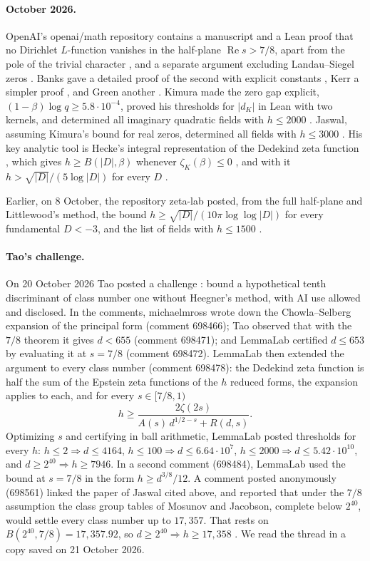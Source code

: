 \documentclass[11pt]{article}
\theoremstyle{definition}
\newcommand{\re}{\operatorname{Re}}
\begin{document}
\paragraph{October 2026.} OpenAI's openai/math repository \cite{OAImath} contains a manuscript and a Lean proof that no Dirichlet $L$-function vanishes in the half-plane $\re s > 7/8$, apart from the pole of the trivial character \cite{OAIqrh}, and a separate argument excluding Landau--Siegel zeros \cite{OAIsiegel}. Banks gave a detailed proof of the second with explicit constants \cite{Banks2026}, Kerr a simpler proof \cite{Kerr2026}, and Green another \cite{Green2026}. Kimura made the zero gap explicit, $(1-\beta)\log q \ge 5.8\cdot10^{-4}$, proved his thresholds for $|d_K|$ in Lean with two kernels, and determined all imaginary quadratic fields with $h \le 2000$ \cite{Kimura2026}. Jaswal, assuming Kimura's bound for real zeros, determined all fields with $h \le 3000$ \cite{Jaswal2026}. His key analytic tool is Hecke's integral representation of the Dedekind zeta function \cite{Hecke1917}, which gives $h \ge B(|D|, \beta)$ whenever $\zeta_K(\beta) \le 0$ \cite[Prop.~2.2]{Jaswal2026}, and with it $h > \sqrt{|D|}/(5\log|D|)$ for every $D$ \cite[Thm.~1.3]{Jaswal2026}.

Earlier, on 8 October, the repository zeta-lab posted, from the full half-plane and Littlewood's method, the bound $h \ge \sqrt{|D|}/(10\pi\log\log|D|)$ for every fundamental $D < -3$, and the list of fields with $h \le 1500$ \cite{ZetaLab2026}.

\paragraph{Tao's challenge.} On 20 October 2026 Tao posted a challenge \cite{Tao2026}: bound a hypothetical tenth discriminant of class number one without Heegner's method, with AI use allowed and disclosed. In the comments, michaelmross wrote down the Chowla--Selberg expansion of the principal form (comment 698466); Tao observed that with the $7/8$ theorem it gives $d < 655$ (comment 698471); and LemmaLab certified $d \le 653$ by evaluating it at $s = 7/8$ (comment 698472). LemmaLab then extended the argument to every class number (comment 698478): the Dedekind zeta function is half the sum of the Epstein zeta functions of the $h$ reduced forms, the expansion applies to each, and for every $s \in [7/8, 1)$
\[
h \ge \frac{2\zeta(2s)}{A(s)\,d^{1/2-s} + R(d,s)} .
\]
Optimizing $s$ and certifying in ball arithmetic, LemmaLab posted thresholds for every $h$: $h \le 2 \Rightarrow d \le 4164$, $h \le 100 \Rightarrow d \le 6.64\cdot10^7$, $h \le 2000 \Rightarrow d \le 5.42\cdot10^{10}$, and $d \ge 2^{40} \Rightarrow h \ge 7946$. In a second comment (698484), LemmaLab used the bound at $s = 7/8$ in the form $h \ge d^{3/8}/12$. A comment posted anonymously (698561) linked the paper of Jaswal cited above, and reported that under the $7/8$ assumption the class group tables of Mosunov and Jacobson, complete below $2^{40}$, would settle every class number up to $17{,}357$. That rests on $B(2^{40}, 7/8) = 17{,}357.92$, so $d \ge 2^{40} \Rightarrow h \ge 17{,}358$ \cite[Remark~4.2]{Jaswal2026}. We read the thread in a copy saved on 21 October 2026.
\end{document}
